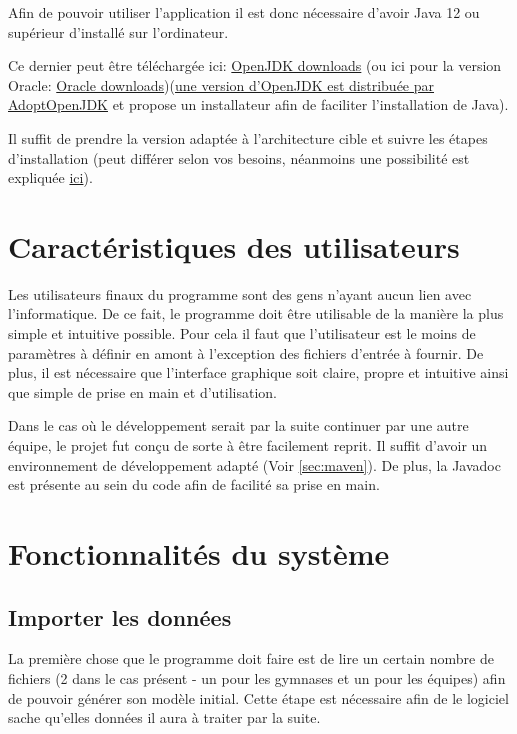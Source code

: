 \documentclass[final, noposter]{polytech/polytech}
\begin{document}
		Afin de pouvoir utiliser l'application il est donc nécessaire d'avoir Java 12 ou supérieur d'installé sur l'ordinateur.
		
		Ce dernier peut être téléchargée ici: \href{https://jdk.java.net/}{OpenJDK downloads} (ou ici pour la version Oracle: \href{https://www.oracle.com/technetwork/java/javase/downloads/index.html}{Oracle downloads})(\href{https://adoptopenjdk.net/}{une version d'OpenJDK est distribuée par AdoptOpenJDK} et propose un installateur afin de faciliter l'installation de Java).
		
	    Il suffit de prendre la version adaptée à l'architecture cible et suivre les étapes d'installation (peut différer selon vos besoins, néanmoins une possibilité est expliquée \href{https://stackoverflow.com/a/52531093/3281185}{ici}).

	\section{Caractéristiques des utilisateurs}
		Les utilisateurs finaux du programme sont des gens n'ayant aucun lien avec l'informatique. De ce fait, le programme doit être utilisable de la manière la plus simple et intuitive possible. Pour cela il faut que l'utilisateur est le moins de paramètres à définir en amont à l'exception des fichiers d'entrée à fournir. De plus, il est nécessaire que l'interface graphique soit claire, propre et intuitive ainsi que simple de prise en main et d'utilisation.
 		
		Dans le cas où le développement serait par la suite continuer par une autre équipe, le projet fut conçu de sorte à être facilement reprit. Il suffit d'avoir un environnement de développement adapté (Voir \autoref{sec:maven}). De plus, la Javadoc est présente au sein du code afin de facilité sa prise en main.

	\section{Fonctionnalités du système}
		\subsection{Importer les données}
			La première chose que le programme doit faire est de lire un certain nombre de fichiers (2 dans le cas présent - un pour les gymnases et un pour les équipes) afin de pouvoir générer son modèle initial. Cette étape est nécessaire afin de le logiciel sache qu'elles données il aura à traiter par la suite.
\end{document}
